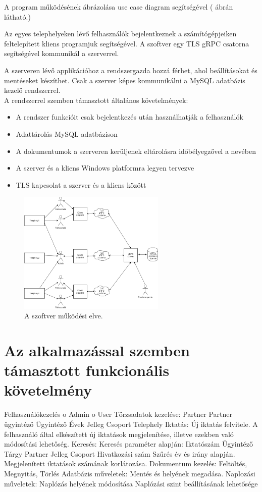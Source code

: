 \documentclass[
]{thesis-ekf}
\theoremstyle{definition}
\theoremstyle{remark}
\begin{document}
A program működésének ábrázolása use case diagram segítségével (\az{\ref{fig:usediag} } ábrán látható.)

Az egyes telephelyeken lévő felhasználók bejelentkeznek a számítógépjeiken feltelepített kliens programjuk segítségével. A szoftver egy TLS gRPC csatorna segítségével kommunikál a szerverrel.

A szerveren lévő applikációhoz a rendszergazda hozzá férhet, ahol beállításokat és mentéseket készíthet. Csak a szerver képes kommunikálni a MySQL adatbázis kezelő rendszerrel.\\
A rendszerrel szemben támasztott általános követelmények:
\begin{itemize}
	\item A rendszer funkcióit csak bejelentkezés után használhatják a felhasználók
	\item Adattárolás MySQL adatbázison
	\item A dokumentumok a szerveren kerüljenek eltárolásra időbélyegzővel a nevében
	\item A szerver és a kliens Windows platformra legyen tervezve
	\item TLS kapcsolat a szerver és a kliens között
\end{itemize}
\begin{figure}[!ht]
	\centering
	\includegraphics[width=7cm]{archdiag}
	\caption[Use Case ábra]{A szoftver működési elve.}
	\label{fig:usediag}
\end{figure}
\section{Az alkalmazással szemben támasztott funkcionális követelmény}
Felhasználókezelés
o	Admin
o	User
Törzsadatok kezelése:
Partner
Partner ügyintéző
Ügyintéző
Évek
Jelleg
Csoport
Telephely
Iktatás:
Új iktatás felvitele. A felhasználó által elkészített új iktatások megjelenítése, illetve ezekben való módosítási lehetőség.
Keresés:
Keresés paraméter alapján:
Iktatószám
Ügyintéző
Tárgy
Partner
Jelleg
Csoport
Hivatkozási szám
Szűrés év és irány alapján.
Megjelenített iktatások számának korlátozása.
Dokumentum kezelés:
Feltöltés, Megnyitás, Törlés
Adatbázis műveletek:
Mentés és helyének megadása.
Naplozási műveletek:
Naplózás helyének módosítása
Naplózási szint beállításának lehetősége
\end{document}
